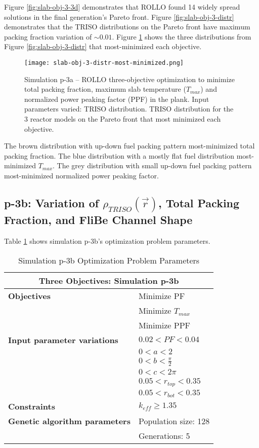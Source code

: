 Figure \ref{fig:slab-obj-3-3d} demonstrates that \gls{ROLLO} found 14 widely spread 
solutions in the final generation's Pareto front. 
Figure \ref{fig:slab-obj-3-distr} demonstrates that the TRISO distributions on the
Pareto front have maximum packing fraction variation of $\sim0.01$. 
Figure \ref{fig:slab-obj-3-distr-most-minimized} shows the three distributions from 
Figure \ref{fig:slab-obj-3-distr} that most-minimized each objective. 
\begin{figure}[htbp!]
    \texttt{[image: slab-obj-3-distr-most-minimized.png]}
    \caption{Simulation p-3a -- ROLLO three-objective optimization to minimize total packing fraction, 
    maximum slab temperature ($T_{max}$) and normalized power peaking factor (PPF) in the plank. 
    Input parameters varied: TRISO distribution. TRISO distribution for the 3 reactor models on the Pareto front
    that most minimized each objective.}
    \label{fig:slab-obj-3-distr-most-minimized}
\end{figure}
The brown distribution with up-down fuel packing pattern most-minimized total packing fraction. 
The blue distribution with a mostly flat fuel distribution most-minimized $T_{max}$. 
The grey distribution with small up-down fuel packing pattern most-minimized normalized 
power peaking factor. 

\subsection{p-3b: Variation of $\rho_{TRISO}(\vec{r})$, Total Packing Fraction, and FliBe Channel Shape}
Table \ref{tab:simulationp3b} shows simulation p-3b's optimization problem parameters. 
\begin{table}[htbp!]
    \centering
    \onehalfspacing
    \caption{Simulation p-3b Optimization Problem Parameters}
	\label{tab:simulationp3b}
    \footnotesize
    \begin{tabular}{l|p{4cm}}
    \hline 
    \multicolumn{2}{c}{\textbf{Three Objectives: Simulation p-3b}} \\
    \hline 
    \textbf{Objectives} & Minimize PF \\
    & Minimize $T_{max}$ \\
    & Minimize PPF \\
    \hline 
    \textbf{Input parameter variations} & $0.02<PF<0.04$ \\
    & $0<a<2$ \\
    & $0<b<\frac{\pi}{2}$ \\
    & $0<c<2\pi$ \\
    & $0.05<r_{top}<0.35$ \\
    & $0.05<r_{bot}<0.35$ \\
    \hline
    \textbf{Constraints} & $k_{eff} \geq 1.35$\\ 
    \hline 
    \textbf{Genetic algorithm parameters} & Population size: 128 \\
    & Generations: 5 \\
    \hline
    \end{tabular}
\end{table}

